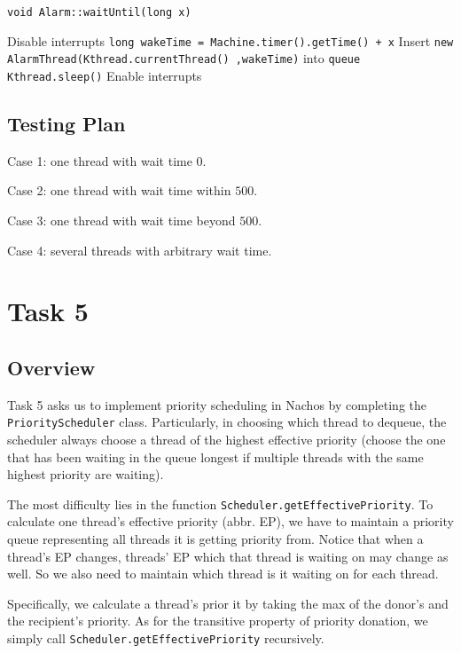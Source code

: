 \documentclass{article}
\begin{document}
\begin{spacing}{1.1}
\begin{algorithm}
\caption{ \texttt{void Alarm::waitUntil(long x)}}
\begin{algorithmic}
\STATE Disable interrupts
\STATE \texttt{long wakeTime = Machine.timer().getTime() + x}
\STATE Insert \texttt{new AlarmThread(Kthread.currentThread() ,wakeTime)} into \texttt{queue}
\STATE \texttt{Kthread.sleep()}
\STATE Enable interrupts
\end{algorithmic}
\end{algorithm}
\subsection{Testing Plan}
\begin{asparaitem}
  \item Case 1: one thread with wait time $0$.
  \item Case 2: one thread with wait time within $500$.
  \item Case 3: one thread with wait time beyond $500$.
  \item Case 4: several threads with arbitrary wait time.
\end{asparaitem}

\section{Task 5}

\subsection{Overview}
Task 5 asks us to implement priority scheduling in Nachos by completing the \texttt{PriorityScheduler} class. Particularly, in choosing which  thread to dequeue, the scheduler always choose a thread of the highest effective priority (choose the one that has been waiting in the queue longest if multiple threads with the same highest priority are waiting).

The most difficulty lies in the function \texttt{Scheduler.getEffectivePriority}. To calculate one thread's effective priority (abbr. EP), we have to maintain a priority queue representing all threads it is getting priority from. Notice that when a thread's EP changes, threads' EP which that thread is waiting on may change as well. So we also need to maintain which thread is it waiting on for each thread.

Specifically, we calculate a thread's prior it  by taking the max of the donor's and the recipient's priority. As for the transitive property of priority donation, we simply call \texttt{Scheduler.getEffectivePriority} recursively.


\end{spacing}
\end{document}
